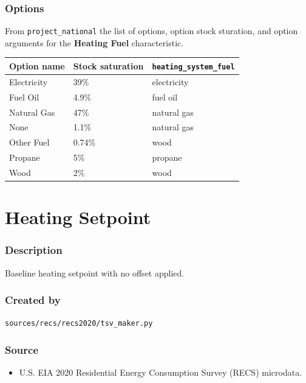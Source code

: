 \subsubsection{Options}\label{options-86}

From \texttt{project\_national} the list of options, option stock
sturation, and option arguments for the \textbf{Heating Fuel}
characteristic.

\begin{longtable}[]{@{}lll@{}}
\toprule\noalign{}
Option name & Stock saturation & \texttt{heating\_system\_fuel} \\
\midrule\noalign{}
\endhead
\bottomrule\noalign{}
\endlastfoot
Electricity & 39\% & electricity \\
Fuel Oil & 4.9\% & fuel oil \\
Natural Gas & 47\% & natural gas \\
None & 1.1\% & natural gas \\
Other Fuel & 0.74\% & wood \\
Propane & 5\% & propane \\
Wood & 2\% & wood \\
\end{longtable}

\section{Heating Setpoint}\label{heating_setpoint}

\subsubsection{Description}\label{description-87}

Baseline heating setpoint with no offset applied.

\subsubsection{Created by}\label{created-by-87}

\texttt{sources/recs/recs2020/tsv\_maker.py}

\subsubsection{Source}\label{source-86}

\begin{itemize}
 
\item
  U.S. EIA 2020 Residential Energy Consumption Survey (RECS) microdata.
\end{itemize}

